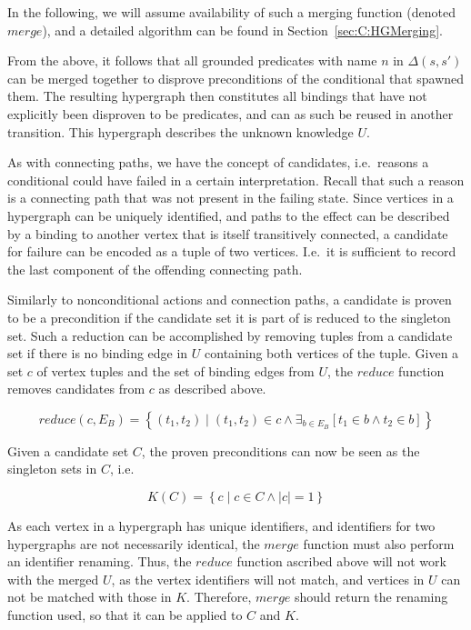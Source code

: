 \documentclass[../Master.tex]{subfiles}
\begin{document}
In the following, we will assume availability of such a merging function (denoted $merge$), and a detailed algorithm can be found in Section~\ref{sec:C:HGMerging}.

From the above, it follows that all grounded predicates with name $n$ in $\Delta\left(s, s'\right)$ can be merged together to disprove preconditions of the conditional that spawned them. The resulting hypergraph then constitutes all bindings that have not explicitly been disproven to be predicates, and can as such be reused in another transition. This hypergraph describes the unknown knowledge $U$.

As with connecting paths, we have the concept of candidates, i.e.\ reasons a conditional could have failed in a certain interpretation. Recall that such a reason is a connecting path that was not present in the failing state. Since vertices in a hypergraph can be uniquely identified, and paths to the effect can be described by a binding to another vertex that is itself transitively connected, a candidate for failure can be encoded as a tuple of two vertices. I.e.\ it is sufficient to record the last component of the offending connecting path.

Similarly to nonconditional actions and connection paths, a candidate is proven to be a precondition if the candidate set it is part of is reduced to the singleton set. Such a reduction can be accomplished by removing tuples from a candidate set if there is no binding edge in $U$ containing both vertices of the tuple. Given a set $c$ of vertex tuples and the set of binding edges from $U$, the $reduce$ function removes candidates from $c$ as described above.

\begin{equation*}
    reduce(c, E_B) =
    \left\{ \left( t_1, t_2 \right) \mid 
        \left( t_1, t_2 \right) \in c \land 
        \exists_{b \in E_B} \left[ t_1 \in b \land t_2 \in b \right] 
    \right\}
\end{equation*}

Given a candidate set $C$, the proven preconditions can now be seen as the singleton sets in $C$, i.e.\ 

\begin{equation*}
    K(C) = \left\{ 
        c \mid c \in C \land |c| = 1
    \right\}
\end{equation*}

As each vertex in a hypergraph has unique identifiers, and identifiers for two hypergraphs are not necessarily identical, the $merge$ function must also perform an identifier renaming. Thus, the $reduce$ function ascribed above will not work with the merged $U$, as the vertex identifiers will not match, and vertices in $U$ can not be matched with those in $K$. Therefore, $merge$ should return the renaming function used, so that it can be applied to $C$ and $K$.
\end{document}
